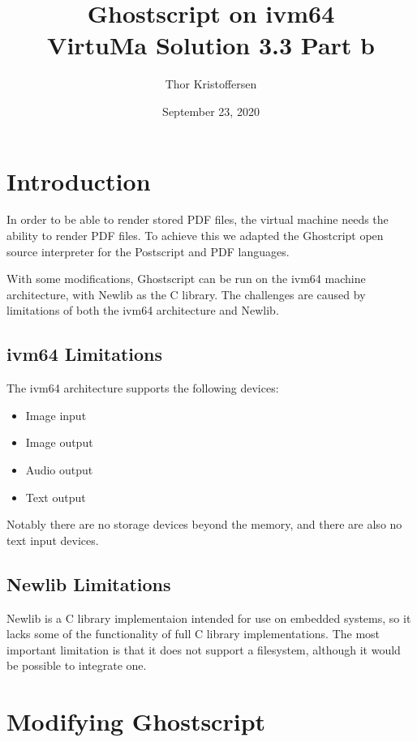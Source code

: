 \documentclass[a4paper,11pt]{article}
\author{Thor Kristoffersen}
\date{September 23, 2020}
\title{Ghostscript on ivm64\\
  \vspace{1ex}
  \large VirtuMa Solution 3.3 Part b}
\begin{document}
\maketitle

\section{Introduction}
\label{sec:introduction}

In order to be able to render stored PDF files, the virtual machine needs the ability to render PDF files. To achieve this we adapted the Ghostcript open source interpreter for the Postscript and PDF languages.

With some modifications, Ghostscript can be run on the ivm64 machine architecture, with Newlib as the C library.
The challenges are caused by limitations of both the ivm64 architecture and Newlib.

\subsection{ivm64 Limitations}

The ivm64 architecture supports the following devices:
\begin{itemize}
\item Image input
\item Image output
\item Audio output
\item Text output
\end{itemize}
Notably there are no storage devices beyond the memory, and there are also no text input devices.

\subsection{Newlib Limitations}

Newlib is a C library implementaion intended for use on embedded systems, so it lacks some of the functionality of full C library implementations.
The most important limitation is that it does not support a filesystem, although it would be possible to integrate one.

\section{Modifying Ghostscript}
\label{sec:modifying-ghostview}
\end{document}
